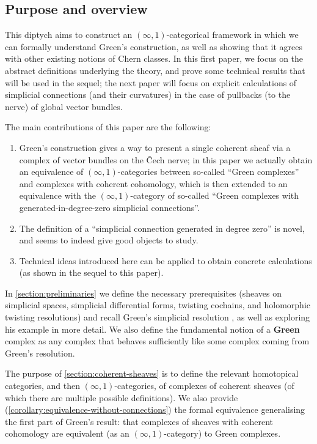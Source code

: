 \documentclass[11pt,fleqn]{article}
\theoremstyle{plain}
\theoremstyle{definition}
\theoremstyle{remark}
\numberwithin{equation}{theorem}
\newcommand{\define}[1]{\textbf{#1}}
\begin{document}
    \subsection{Purpose and overview}

    This diptych aims to construct an $(\infty,1)$-categorical framework in which we can formally understand Green's construction, as well as showing that it agrees with other existing notions of Chern classes.
    In this first paper, we focus on the abstract definitions underlying the theory, and prove some technical results that will be used in the sequel; the next paper \cite{Hosgood2020a} will focus on explicit calculations of simplicial connections (and their curvatures) in the case of pullbacks (to the nerve) of global vector bundles.

    \medskip

    The main contributions of this paper are the following:
    \begin{enumerate}
        \item Green's construction gives a way to present a single coherent sheaf via a complex of vector bundles on the Čech nerve; in this paper we actually obtain an equivalence of $(\infty,1)$-categories between so-called ``Green complexes'' and complexes with coherent cohomology, which is then extended to an equivalence with the $(\infty,1)$-category of so-called ``Green complexes with generated-in-degree-zero simplicial connections''.
        \item The definition of a ``simplicial connection generated in degree zero'' is novel, and seems to indeed give good objects to study.
        \item Technical ideas introduced here can be applied to obtain concrete calculations (as shown in the sequel to this paper).
    \end{enumerate}

    \medskip

    In \cref{section:preliminaries} we define the necessary prerequisites (sheaves on simplicial spaces, simplicial differential forms, twisting cochains, and holomorphic twisting resolutions) and recall Green's simplicial resolution \cite[§1.4]{Green1980}, as well as exploring his example \cite[pp.~41-42]{Green1980} in more detail.
    We also define the fundamental notion of a \define{Gre{}en} complex as any complex that behaves sufficiently like some complex coming from Green's resolution.

    The purpose of \cref{section:coherent-sheaves} is to define the relevant homotopical categories, and then $(\infty,1)$-categories, of complexes of coherent sheaves (of which there are multiple possible definitions).
    We also provide (\cref{corollary:equivalence-without-connections}) the formal equivalence generalising the first part of Green's result: that complexes of sheaves with coherent cohomology are equivalent (as an $(\infty,1)$-category) to Green complexes.
\end{document}
